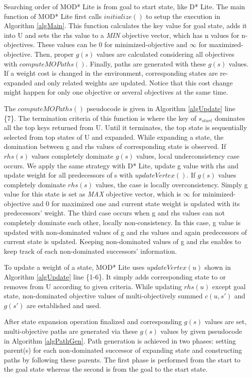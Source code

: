 \documentclass[10pt, a4paper, conference, compsocconf]{IEEEtran}
\begin{document}
Searching order of MOD* Lite is from goal to start state, like D* Lite. The main function of MOD* Lite first calls $initialize()$ to setup the execution in Algorithm \ref{algMain}. This function calculates the key value for goal state, adds it into U and sets the rhs value to a \textit{MIN} objective vector, which has n values for n-objectives. These values can be $0$ for minimized-objective and $\infty$ for maximized-objective. Then, proper $g(s)$ values are calculated considering all objectives with $computeMOPaths()$. Finally, paths are generated with these $g(s)$ values. If a weight cost is changed in the environment, corresponding states are re-expanded and only related weights are updated. Notice that this cost change might happen for only one objective or several objectives at the same time.

The $computeMOPaths()$ pseudocode is given in Algorithm \ref{algUpdate} line \{7\}. The termination criteria of this function is where the key of $s_{start}$ dominates all the top keys returned from U. Until it terminates, the top state is sequentially selected from top states of U and expanded. While expanding a state, the domination between g and rhs values of corresponding state is observed. If $rhs(s)$ values completely dominate $g(s)$ values, local underconsistency case occurs. We apply the same strategy with D* Lite, update g value with rhs and update weight for all predecessors of s with $updateVertex()$. If $g(s)$ values completely dominate $rhs(s)$ values, the case is locally overconsistency. Simply g value for this state is set as \textit{MAX} objective vector, which is $\infty$ for minimized-objective and $0$ for maximized one and current state weight is updated with its predecessors' weight. The third case occurs when g and rhs values can not completely dominate each other, locally non-consistency. In this case, g value is updated with non-dominated values of g and rhs values and again predecessors of current state is updated. Keeping non-dominated values of g and rhs enables to keep track of each non-dominated successors' information.

To update a weight of a state, MOD* Lite uses $updateVertex(u)$ shown in Algorithm \ref{algUpdate} line \{1-6\}. It simply adds corresponding state to or removes from U according to given criteria. While updating $rhs(u)$ except goal state, non-dominated objective values of multi-objectively summed $c(u,s')$ and $g(s')$ are established and used.

After state expansion operation finalized and corresponding $g(s)$ values are set, multi-objective paths are generated via these $g(s)$ values by given pseudocode in Algorithm \ref{algPathGen}. Path generation is achieved in two phases: setting parent(s) for each non-dominated successor of expanding state and constructing paths by following these parents. The first phase is performed from the start to the goal state whereas the second is from the goal to the start state. 
\end{document}
